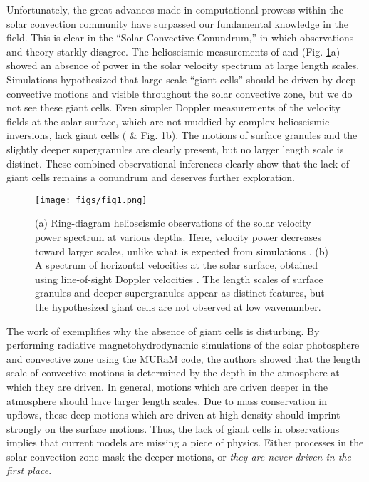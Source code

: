 \documentclass[aasms,12pt]{article}
\begin{document}
Unfortunately, the great advances made in computational prowess within the solar convection
community have surpassed our fundamental knowledge in the field. This is clear in the
``Solar Convective Conundrum,'' in which observations and theory starkly disagree.
The helioseismic measurements of \cite{hanasoge&all2012} and \cite{greer&all2015} (Fig. \ref{fig:fig1}a)
showed an absence of power in the solar velocity spectrum at large length scales.  Simulations
hypothesized that large-scale
``giant cells'' should be driven by deep convective motions and visible throughout the solar convective
zone, but we do not see these giant cells.
Even simpler Doppler measurements of the velocity fields at the solar surface, which are not muddied
by complex helioseismic inversions, lack
giant cells (\citealt{hathaway&all2015} \& Fig. \ref{fig:fig1}b).  
The motions of surface granules and the slightly deeper supergranules are clearly present, but no
larger length scale is distinct.  These combined observational inferences clearly show that the lack of
giant cells remains a conundrum and deserves further exploration.

\begin{figure}[t]
\centering
\texttt{[image: figs/fig1.png]}
\caption{(a) Ring-diagram helioseismic observations of the solar velocity power spectrum at various depths.  
Here, velocity power decreases toward larger scales, unlike what is expected from simulations
\citep{greer&all2015}.  (b) A spectrum of horizontal
velocities at the solar surface, obtained using line-of-sight Doppler velocities \citep{hathaway&all2015}.
The length scales of surface granules and deeper supergranules appear as distinct features, but
the hypothesized giant cells are not observed at low wavenumber.
        \label{fig:fig1}}
\end{figure}

The work of \cite{lord&all2014} exemplifies why the absence of giant cells is disturbing.
By performing radiative magnetohydrodynamic simulations of the solar photosphere and convective zone using the
MURaM code, the authors
showed that the length scale of convective motions is determined by the depth in the atmosphere at 
which they are driven. In general, motions which are driven deeper in the atmosphere should have
larger length scales.
Due to mass conservation in upflows, these deep motions which are driven at high density should imprint
strongly on the surface motions. Thus,
the lack of giant cells in observations implies that current models are missing a piece of physics. 
Either processes in the solar convection zone mask the deeper motions, or \emph{they are never driven
in the first place}.
\end{document}
